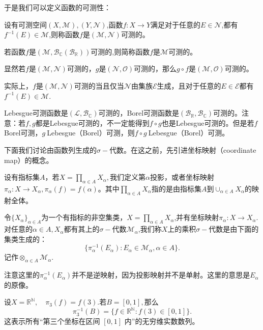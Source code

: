 \documentclass[lang=cn,10pt]{elegantbook}
\begin{document}
	于是我们可以定义函数的可测性：
	\begin{definition}[可测函数]
		设有可测空间\((X,\mathcal{M}),(Y,\mathcal{N})\),函数\(f:X\to Y\)满足对于任意的\(E\in \mathcal{N}\),都有\(f^{-1}(E)\in \mathcal{M}\),则称函数\(f\)是\((\mathcal{M},\mathcal{N})\)可测的。

		若函数\(f\)是\((\mathcal{M},\mathcal{B}_\mathbb{C}(\mathcal{B}_\mathbb{R}))\)可测的,则简称函数\(f\)是\(\mathcal{M}\)可测的。
	\end{definition}
	\begin{note}
		显然若\(f\)是\((\mathcal{M},\mathcal{N})\)可测的，\(g\)是\((\mathcal{N},\mathcal{O})\)可测的，那么\(g\circ f\)是\((\mathcal{M},\mathcal{O})\)可测的。

		实际上，\(f\)是\((\mathcal{M},\mathcal{N})\)可测的当且仅当\(\mathcal{N}\)由集族\(\mathcal{E}\)生成，且对于任意的\(E\in \mathcal{E}\)都有\(f^{-1}(E)\in \mathcal{M}\).
	\end{note}
	\begin{example}
		Lebesgue可测函数是\((\mathcal{L},\mathcal{B}_\mathbb{C})\)可测的，Borel可测函数是\((\mathcal{B}_\mathbb{R},\mathcal{B}_\mathbb{C})\)可测的。注意：若\(f,g\)都是Lebesgue可测的，不一定能得到\(f\circ g\)也是Lebesgue可测的。但是若\(f\ \)Borel可测，\(g\ \)Lebesgue（Borel）可测，则\(f\circ g\ \)Lebesgue（Borel）可测。
	\end{example}
	下面我们讨论由函数列生成的\(\sigma-\)代数。在这之前，先引进坐标映射（coordinate map）的概念。
	\begin{definition}[坐标映射]
		设有指标集\(A\)，若\(X=\prod_{\alpha\in A}X_\alpha,\)我们定义第\(\alpha\)投影，或者坐标映射\(\pi_\alpha:X\to X_\alpha,\pi_\alpha(f)=f(\alpha)\)。其中\(\prod_{\alpha\in A}X_\alpha\)指的是由指标集\(A\)到\(\cup_{\alpha\in A}X_\alpha\)的映射全体。
	\end{definition}
	\begin{definition}[乘积\(\sigma-\)代数]
		令\(\{X_\alpha\}_{\alpha\in A}\)为一个有指标的非空集类，\(X=\prod_{\alpha\in A}X_\alpha\),并有坐标映射\(\pi_\alpha:X\to X_\alpha\).对任意的\(\alpha\in A,X_\alpha\)都有其上的\(\sigma-\)代数\(\mathcal{M}_\alpha\),我们称\(X\)上的乘积\(\sigma-\)代数是由下面的集类生成的：
		\[\{\pi^{-1}_\alpha(E_\alpha):E_\alpha\in \mathcal{M}_\alpha,\alpha\in A\}.\]
		记作\(\otimes_{\alpha\in A}\mathcal{M}_\alpha\).
	\end{definition}
	\begin{note}
		注意这里的\(\pi^{-1}_\alpha(E_\alpha)\)并不是逆映射，因为投影映射并不是单射。这里的意思是\(E_\alpha\)的原像。
	\end{note}
	\begin{example}[无穷维数列的坐标映射]
	设\(X = \mathbb{R}^\mathbb{N}, \quad \pi_3(f) = f(3).\)若\(B = [0,1],\)那么
	\[\pi_3^{-1}(B) = \{ f \in \mathbb{R}^\mathbb{N} : f(3) \in [0,1] \}.\]
	这表示所有“第三个坐标在区间 $[0,1]$ 内”的无穷维实数数列。
	\end{example}
\end{document}
